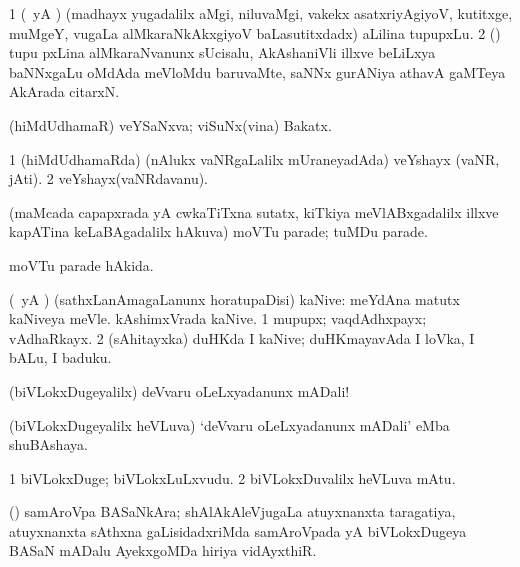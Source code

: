 \bentry
{} 
\gl{\nA}
\expl{}
\bmng
\bnum
\num{1} (\pArxparx\ yA \ca) (madhayx yugadalilx aMgi, niluvaMgi, \mo vakekx asatxriyAgiyoV, kutitxge, muMgeY, \mo vugaLa alMkaraNkAkxgiyoV baLasutitxdadx) aLilina tupupxLu. 
\num{2} (\vaMlAM) tupu pxLina alMkaraNvanunx sUcisalu, AkAshaniVli illxve beLiLxya baNNxgaLu oMdAda meVloMdu baruvaMte, saNNx gurANiya athavA gaMTeya AkArada citarxN. 
\enum
\emng
\eentry

\bentry
{} 
\gl{\nA}
\expl{}
\bmng
 (hiMdUdhamaR) veYSaNxva; viSuNx(vina) Bakatx. 
\emng
\eentry

\bentry
{} 
\gl{\nA}
\expl{}
\bmng
\bnum
\num{1} (hiMdUdhamaRda) (nAlukx vaNRgaLalilx mUraneyadAda) veYshayx (vaNR, jAti). 
\num{2} veYshayx(vaNRdavanu). 
\enum
\emng
\eentry

\bentry
{} 
\gl{\nA}
\expl{}
\bmng
 (maMcada capapxrada yA cwkaTiTxna sutatx, kiTkiya meVlABxgadalilx illxve kapATina keLaBAgadalilx hAkuva) moVTu parade; tuMDu parade. 
\emng
\eentry

\bentry
{} 
\gl{\gu}
\expl{}
\bmng
moVTu parade hAkida. 
\emng
\eentry

\bentry
{} 
\gl{\nA}
\expl{}
\bmng
 (\pArxparx\ yA \kAparx) (sathxLanAmagaLanunx horatupaDisi) kaNive:  meYdAna matutx kaNiveya meVle.  kAshimxVrada kaNive. \nuga 
\bnum
\num{1}  mupupx; vaqdAdhxpayx; vAdhaRkayx. 
\num{2}  (sAhitayxka) duHKda I kaNive; duHKmayavAda I loVka, I bALu, I baduku. 
\enum
\emng
\eentry

\bentry
{} 
\gl{\BAavayx}
\expl{}
\bmng
 (biVLokxDugeyalilx) deVvaru oLeLxyadanunx mADali! 
\emng
\eentry

\bentry
{} 
\gl{\nA}
\expl{}
\bmng
 (biVLokxDugeyalilx heVLuva) `deVvaru oLeLxyadanunx mADali' eMba shuBAshaya. 
\emng
\eentry

\bentry
{} 
\gl{\nA}
\expl{}
\bmng
\bnum
\num{1} biVLokxDuge; biVLokxLuLxvudu. 
\num{2} biVLokxDuvalilx heVLuva mAtu. 
\enum
\emng
\eentry

\bentry
{} 
\gl{\nA}
\expl{}
\bmng
 (\ame) samAroVpa BASaNkAra; shAlAkAleVjugaLa atuyxnanxta taragatiya, atuyxnanxta sAthxna gaLisidadxriMda samAroVpada yA biVLokxDugeya BASaN mADalu AyekxgoMDa hiriya vidAyxthiR. 
\emng
\eentry

